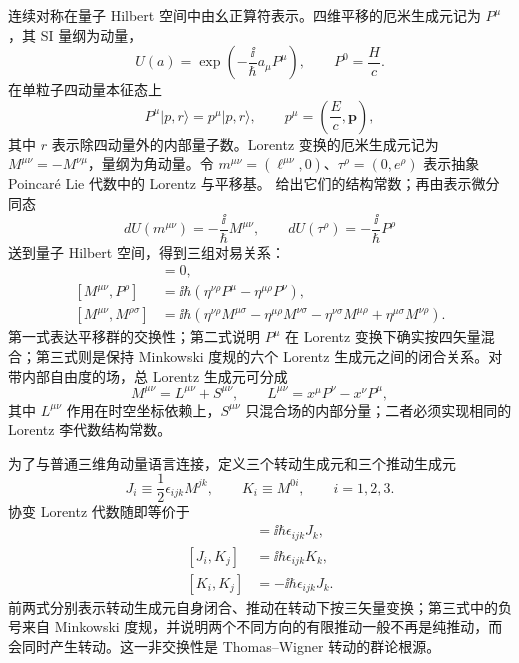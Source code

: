 连续对称在量子 Hilbert 空间中由幺正算符表示。四维平移的厄米生成元记为 $P^\mu$，其 SI 量纲为动量，
\begin{equation}
 U(a)=\exp\!\left(-\frac{\ii}{\hbar}a_\mu P^\mu\right),
 \qquad P^0=\frac{H}{c}.
 \label{eq:translation-unitary-r15}
\end{equation}
在单粒子四动量本征态上
\begin{equation}
 P^\mu|p,r\rangle=p^\mu|p,r\rangle,
 \qquad
 p^\mu=\left(\frac{E}{c},\mathbf p\right),
 \label{eq:P-eigenvalue-r15}
\end{equation}
其中 $r$ 表示除四动量外的内部量子数。Lorentz 变换的厄米生成元记为 $M^{\mu\nu}=-M^{\nu\mu}$，量纲为角动量。令 $m^{\mu\nu}=(\ell^{\mu\nu},0)$、$\tau^\rho=(0,e^\rho)$ 表示抽象 Poincar\'e Lie 代数中的 Lorentz 与平移基。 给出它们的结构常数；再由表示微分同态
\begin{equation*}
 dU(m^{\mu\nu})=-\frac{\ii}{\hbar}M^{\mu\nu},
 \qquad
 dU(\tau^\rho)=-\frac{\ii}{\hbar}P^\rho
\end{equation*}
送到量子 Hilbert 空间，得到三组对易关系：
\begin{align}
 [P^\mu,P^\nu]&=0,
 \label{eq:poincare-pp}\\
 [M^{\mu\nu},P^\rho]
 &=\ii\hbar\left(
 \eta^{\nu\rho}P^\mu-\eta^{\mu\rho}P^\nu
 \right),
 \label{eq:poincare-mp}\\
 [M^{\mu\nu},M^{\rho\sigma}]
 &=\ii\hbar\left(
 \eta^{\nu\rho}M^{\mu\sigma}
 -\eta^{\mu\rho}M^{\nu\sigma}
 -\eta^{\nu\sigma}M^{\mu\rho}
 +\eta^{\mu\sigma}M^{\nu\rho}
 \right).
 \label{eq:poincare-mm}
\end{align}
第一式表达平移群的交换性；第二式说明 $P^\mu$ 在 Lorentz 变换下确实按四矢量混合；第三式则是保持 Minkowski 度规的六个 Lorentz 生成元之间的闭合关系。对带内部自由度的场，总 Lorentz 生成元可分成
\begin{equation}
 M^{\mu\nu}=L^{\mu\nu}+S^{\mu\nu},
 \qquad
 L^{\mu\nu}=x^\mu P^\nu-x^\nu P^\mu,
 \label{eq:orbital-plus-spin}
\end{equation}
其中 $L^{\mu\nu}$ 作用在时空坐标依赖上，$S^{\mu\nu}$ 只混合场的内部分量；二者必须实现相同的 Lorentz 李代数结构常数。

为了与普通三维角动量语言连接，定义三个转动生成元和三个推动生成元
\begin{equation}
 J_i\equiv\frac12\epsilon_{ijk}M^{jk},
 \qquad
 K_i\equiv M^{0i},
 \qquad i=1,2,3.
 \label{eq:rotation-boost-generators-dp34}
\end{equation}
协变 Lorentz 代数随即等价于
\begin{align}
 [J_i,J_j]&=\ii\hbar\epsilon_{ijk}J_k,\\
 [J_i,K_j]&=\ii\hbar\epsilon_{ijk}K_k,\\
 [K_i,K_j]&=-\ii\hbar\epsilon_{ijk}J_k.
 \label{eq:JK-algebra}
\end{align}
前两式分别表示转动生成元自身闭合、推动在转动下按三矢量变换；第三式中的负号来自 Minkowski 度规，并说明两个不同方向的有限推动一般不再是纯推动，而会同时产生转动。这一非交换性是 Thomas--Wigner 转动的群论根源。

